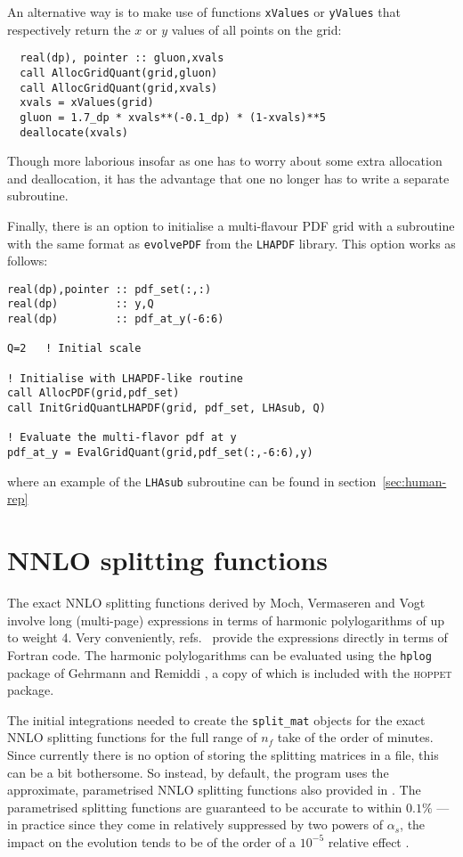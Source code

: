 \documentclass[12pt]{article}
\newcommand{\as}{\alpha_s}
\newcommand{\hoppet}{\textsc{hoppet}\xspace}
\newcommand{\ttt}[1]{\texttt{#1}}
\begin{document}
An alternative way is to
make use of functions \texttt{xValues} or \texttt{yValues} that
respectively return the $x$ or $y$ values of all points on the grid:
\begin{lstlisting}
  real(dp), pointer :: gluon,xvals
  call AllocGridQuant(grid,gluon)
  call AllocGridQuant(grid,xvals)
  xvals = xValues(grid)
  gluon = 1.7_dp * xvals**(-0.1_dp) * (1-xvals)**5 
  deallocate(xvals)
\end{lstlisting}
Though more laborious insofar as one has to worry about some extra
allocation and deallocation, it has the advantage that one no longer
has to write a separate subroutine.

Finally, there is an option to initialise a multi-flavour
PDF grid with a subroutine with the same format as
\ttt{evolvePDF} from the \ttt{LHAPDF} library. This
option works as follows:

\begin{lstlisting}
real(dp),pointer :: pdf_set(:,:)
real(dp)         :: y,Q
real(dp)         :: pdf_at_y(-6:6)

Q=2   ! Initial scale

! Initialise with LHAPDF-like routine
call AllocPDF(grid,pdf_set)
call InitGridQuantLHAPDF(grid, pdf_set, LHAsub, Q)

! Evaluate the multi-flavor pdf at y
pdf_at_y = EvalGridQuant(grid,pdf_set(:,-6:6),y)

\end{lstlisting}
where an example of  the \ttt{LHAsub} subroutine can be found in
section~\ref{sec:human-rep}

\section{NNLO splitting functions}
\label{sect:nnlo}
The exact NNLO splitting
functions derived by Moch, Vermaseren and Vogt
\cite{NNLO-NS,NNLO-singlet} involve long (multi-page) expressions in
terms of harmonic polylogarithms of up to weight 4. Very conveniently,
refs.~\cite{NNLO-NS,NNLO-singlet} provide the expressions directly in
terms of Fortran code.
%
The harmonic polylogarithms can be evaluated using the \ttt{hplog}
package of Gehrmann and Remiddi \cite{FortranPolyLog}, a copy of which
is included with the \hoppet package. 

The initial integrations needed to create the \ttt{split\_mat} objects
for the exact NNLO splitting functions for the full range of $n_f$
take of the order of minutes.  Since currently there is no option of
storing the splitting matrices in a file, this can be a bit
bothersome. So instead, by default, the program uses the approximate,
parametrised NNLO splitting functions also provided in
\cite{NNLO-NS,NNLO-singlet}. The parametrised splitting functions are
guaranteed to be accurate to within $0.1\%$ --- in practice since they
come in relatively suppressed by two powers of $\as$, the impact on
the evolution tends to be of the order of a  $10^{-5}$ relative effect
\cite{Giele:2002hx,Dittmar:2005ed}.
\end{document}
